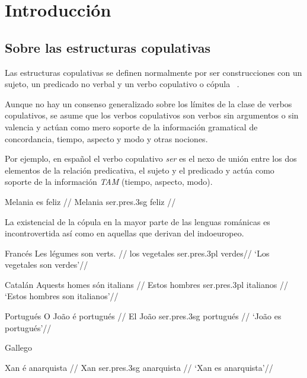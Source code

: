 \chapter{Introducción}
\vspace*{-.25in}
\section{Sobre las estructuras copulativas}
Las estructuras copulativas se definen normalmente por ser construcciones con un sujeto, un predicado no verbal y un verbo copulativo o cópula ~\autocite{Bentley20179Copular-and-}. 

Aunque no hay un consenso generalizado sobre los límites de la clase de verbos copulativos, se asume que los verbos copulativos son verbos sin argumentos o sin valencia y actúan como mero soporte de la información gramatical de concordancia, tiempo, aspecto y modo y otras nociones. 

Por ejemplo, en español el verbo copulativo \textit{ser} es el nexo de unión entre los dos elementos de la relación predicativa, el sujeto y el predicado y actúa como soporte de la información \textit{TAM} (tiempo, aspecto, modo).

\ex[glspace=!1em,everygla={},everyglb={},aboveglbskip=-.2ex]
\begingl
\gla Melania es feliz //
\glb Melania ser.{\sc pres}.{\sc 3sg} feliz  //
\endgl
\xe

La existencial de la cópula en la mayor parte de las lenguas románicas es incontrovertida así como en aquellas que derivan del indoeuropeo. 

Francés
\ex[glspace=!1em,everygla={},everyglb=\footnotesize,aboveglbskip=-.2ex]
\begingl
\gla Les légumes son verts. //
\glb los vegetales ser.{\sc pres}.{\sc 3pl} verdes//
\glft ‘Los vegetales son verdes’//
\endgl
\xe


Catalán
\ex[glspace=!1em,everygla={},everyglb={},aboveglbskip=-.2ex]
\begingl
\gla Aquests homes són italians //
\glb Estos hombres ser.{\sc pres}.{\sc 3pl} italianos  //
\glft ‘Estos hombres son italianos’//
\endgl
\xe


Portugués
\ex[glspace=!1em,everygla={},everyglb={},aboveglbskip=-.2ex]
\begingl
\gla O João é portugués //
\glb El João ser.{\sc pres}.{\sc 3sg} portugués  //
\glft ‘João es portugués’//
\endgl
\xe

Gallego

\ex[glspace=!1em,everygla={},everyglb={},aboveglbskip=-.2ex]
\begingl
\gla Xan é anarquista //
\glb Xan ser.{\sc pres}.{\sc 3sg} anarquista  //
\glft ‘Xan es anarquista’//
\endgl
\xe


